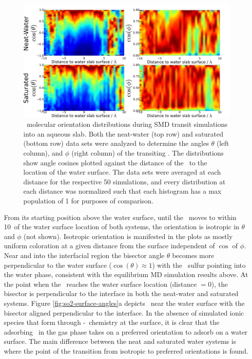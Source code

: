 \documentclass{article}
\begin{document}
\begin{figure}[h!]
	\begin{center}
		\includegraphics[scale=1.0]{images/so2-angles-transit.png}
		\caption{\suldiox~molecular orientation distributions during SMD transit simulations into an aqueous slab. Both the neat-water (top row) and saturated (bottom row) data sets were analyzed to determine the angles $\theta$ (left column), and $\phi$ (right column) of the transiting \suldiox. The distributions show angle cosines plotted against the distance of the \suldiox~to the location of the water surface. The data sets were averaged at each distance for the respective 50 simulations, and every distribution at each distance was normalized such that each histogram has a max population of 1 for purposes of comparison.}
		\label{fig:so2-transit-angles}
	\end{center}
\end{figure}

	From its starting position above the water surface, until the \suldiox~moves to within 10\angs~of the water surface location of both systems, the orientation is isotropic in $\theta$ and $\phi$ (not shown). Isotropic orientation is manifested in the plots as mostly uniform coloration at a given distance from the surface independent of $\cos$ of $\phi$. Near and into the interfacial region the bisector angle $\theta$ becomes more perpendicular to the water surface ($\cos(\theta)\approx1$) with the \suldiox~sulfur pointing into the water phase, consistent with the equilibrium MD simulation results above. At the point when the \suldiox~reaches the water surface location (distance $=0$\angs), the bisector is perpendicular to the interface in both the neat-water and saturated systems. Figure \ref{fig:so2-surface-angles}a depicts \suldiox~near the water surface with the bisector aligned perpendicular to the interface. In the absence of simulated ionic species that form through \suldiox-\wat~chemistry at the surface, it is clear that the adsorbing \suldiox~in the gas phase takes on a preferred orientation to adsorb on a water surface. The main difference between the neat and saturated water systems is where the point of the transition from isotropic to preferred orientations is found. 
 
\end{document}
